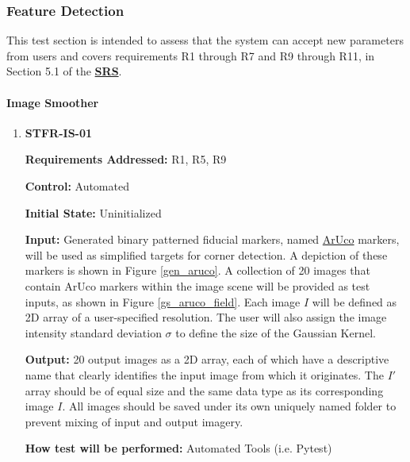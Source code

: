 \documentclass[12pt, titlepage]{article}
\begin{document}
\subsubsection{Feature Detection}
This test section is intended to assess that the system can accept new parameters from users and covers 
requirements R1 through R7 and R9 through R11, in Section 5.1 of the 
\textbf{\href{https://github.com/KiranSingh15/CAS-741-Image-Correspondences/blob/main/docs/SRS/SRS.pdf}
{SRS}}. 
		
\paragraph{Image Smoother}
\begin{enumerate}
\item \hypertarget{STFR-IS-01}{\textbf{STFR-IS-01}}

\textbf{Requirements Addressed:} R1, R5, R9

\textbf{Control:} Automated		

\textbf{Initial State:} Uninitialized

\textbf{Input:} Generated binary patterned fiducial markers, named 
\href{https://docs.opencv.org/4.x/d5/dae/tutorial_aruco_detection.html}
{ArUco} markers, will be used as simplified targets for corner detection. A depiction of these markers is shown 
in Figure \ref{gen_aruco}. A collection of 20 images that contain ArUco markers within the image scene will be 
provided as test inputs, as shown in Figure \ref{gs_aruco_field}. Each image $I$ will be defined as 2D array of 
a user-specified resolution. The user will also assign the image intensity standard deviation $\sigma$ to define 
the size of the Gaussian Kernel.

\textbf{Output:} 20 output images as a 2D array, each of which have a descriptive name that clearly identifies the 
input image from which it originates. The $I'$ array should be of equal size and the same data type as its 
corresponding image $I$. All images should be saved under its own uniquely named folder to prevent mixing 
of input and output imagery.

\textbf{How test will be performed:} Automated Tools (i.e. Pytest)

\end{enumerate}
\end{document}
